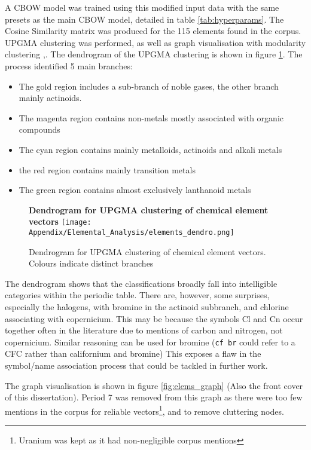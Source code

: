 A CBOW model was trained using this modified input data with the same presets as the main CBOW model, detailed in table \ref{tab:hyperparams}. The Cosine Similarity matrix was produced for the 115 elements found in the corpus. UPGMA clustering was performed\cite{scikitlearn}, as well as graph visualisation with modularity clustering \cite{modularity1},\cite{modularity2}. The dendrogram of the UPGMA clustering is shown in figure \ref{fig:elems_dendro}. The process identified 5 main branches:
\begin{itemize}
\item The gold region includes a sub-branch of noble gases, the other branch mainly actinoids.
\item The magenta region contains non-metals mostly associated with organic compounds
\item The cyan region contains mainly metalloids, actinoids and alkali metals
\item the red region contains mainly transition metals
\item The green region contains almost exclusively lanthanoid metals 
\end{itemize}
\begin{center}
\begin{figure}[H]
  \centering
  \textbf{Dendrogram for UPGMA clustering of chemical element vectors}
    \texttt{[image: Appendix/Elemental\_Analysis/elements\_dendro.png]}
    \caption[Dendrogram for UPGMA clustering of chemical element vectors]{Dendrogram for UPGMA clustering of chemical element vectors. Colours indicate distinct branches}
    \label{fig:elems_dendro}
\end{figure} 
\end{center}
The dendrogram shows that the classifications broadly fall into intelligible categories within the periodic table. There are, however, some surprises, especially the halogens, with bromine in  the actinoid subbranch, and chlorine associating with copernicium. This may be because the symbols Cl and Cn occur together often in the literature due to mentions of carbon and nitrogen, not copernicium. Similar reasoning can be used for bromine (\texttt{cf br} could refer to a CFC rather than californium and bromine) This exposes a flaw in the symbol/name association process that could be tackled in further work.

The graph visualisation is shown in figure \ref{fig:elems_graph} (Also the front cover of this dissertation). Period 7 was removed from this graph as there were too few mentions in the corpus for reliable vectors\footnote{Uranium was kept as it had non-negligible corpus mentions}, and to remove cluttering nodes.

